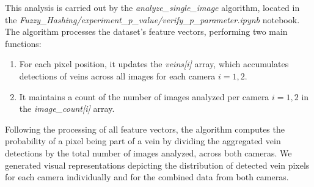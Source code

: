 This analysis is carried out by the \textit{analyze\_single\_image} algorithm, located in the \textit{Fuzzy\_Hashing/experiment\_p\_value/verify\_p\_parameter.ipynb} notebook. The algorithm processes the dataset's feature vectors, performing two main functions:
\begin{enumerate}
    \item For each pixel position, it updates the \textit{veins[i]} array, which accumulates detections of veins across all images for each camera \(i={1,2}\).
    \item It maintains a count of the number of images analyzed per camera \(i={1,2}\) in the \textit{image\_count[i]} array.
\end{enumerate}

Following the processing of all feature vectors, the algorithm computes the probability of a pixel being part of a vein by dividing the aggregated vein detections by the total number of images analyzed, across both cameras. We generated visual representations depicting the distribution of detected vein pixels for each camera individually and for the combined data from both cameras.

